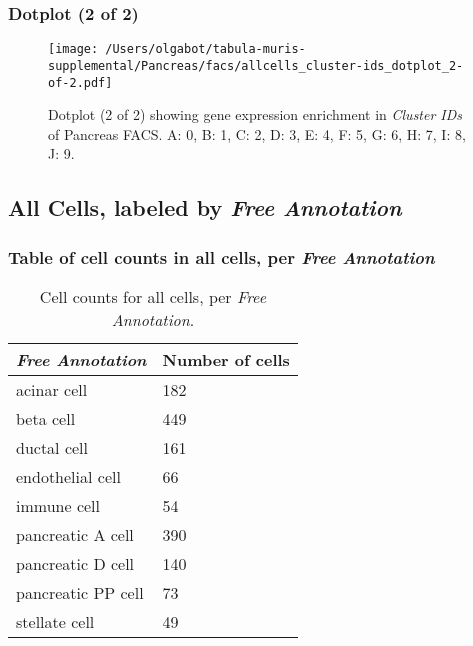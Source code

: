 \clearpage

\subsubsection{Dotplot (2 of 2)}
\begin{figure}[h]
\centering
\texttt{[image: /Users/olgabot/tabula-muris-supplemental/Pancreas/facs/allcells\_cluster-ids\_dotplot\_2-of-2.pdf]}

\caption{ Dotplot (2 of 2)  showing gene expression enrichment in \emph{Cluster IDs} of Pancreas FACS. A: 0, B: 1, C: 2, D: 3, E: 4, F: 5, G: 6, H: 7, I: 8, J: 9.}
\end{figure}


\clearpage

\subsection{All Cells, labeled by \emph{Free Annotation}}
\subsubsection{Table of cell counts in all cells, per \emph{Free Annotation}}\begin{table}[h]
\centering
\label{my-label}
\begin{tabular}{@{}ll@{}}
\toprule

\emph{Free Annotation}& Number of cells \\ \midrule
acinar cell & 182 \\

beta cell & 449 \\

ductal cell & 161 \\

endothelial cell & 66 \\

immune cell & 54 \\

pancreatic A cell & 390 \\

pancreatic D cell & 140 \\

pancreatic PP cell & 73 \\

stellate cell & 49 \\
\bottomrule
\end{tabular}
\caption{Cell counts for all cells, per \emph{Free Annotation}.}
\end{table}

